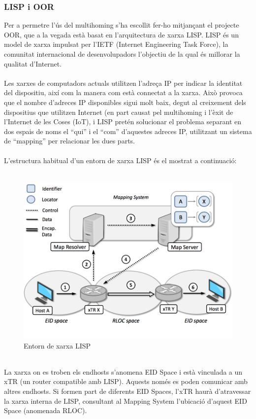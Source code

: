 \documentclass[11pt]{article}
\begin{document}
\subsubsection{LISP i OOR}
Per a permetre l’ús del multihoming s’ha escollit fer-ho mitjançant el projecte OOR, que a la vegada està basat en l’arquitectura de xarxa LISP.
LISP és un model de xarxa impulsat per l’IETF (Internet Engineering Task Force), la comunitat internacional de desenvolupadors l’objectiu de la qual és millorar la qualitat d’Internet. \\
\\
Les xarxes de computadors actuals utilitzen l’adreça IP per indicar la identitat del dispositiu, així com la manera com està connectat a la xarxa. Això provoca que el nombre d’adreces IP disponibles sigui molt baix, degut al creixement dels dispositius que utilitzen Internet (en part causat pel multihoming i l’èxit de l’Internet de les Coses (IoT), i LISP pretén solucionar el problema separant en dos espais de noms el “qui” i el “com” d’aquestes adreces IP, utilitzant un sistema de “mapping” per  relacionar les dues parts.\\
\\
L’estructura habitual d’un entorn de xarxa LISP és el mostrat a continuació:\\
\\
\begin{figure}[h]
	\centering
	\includegraphics[width=14cm]{lisp}
	\caption{Entorn de xarxa LISP}
\end{figure}
\\
La xarxa on es troben els endhosts s’anomena EID Space i està vinculada a un xTR (un router compatible amb LISP). Aquests només es poden comunicar amb altres endhosts. Si formen part de diferents EID Spaces, l'xTR haurà d'atravessar la xarxa interna de LISP, consultant al Mapping System l'ubicació d'aquest EID Space (anomenada RLOC)\cite{alberto15}.
\end{document}
